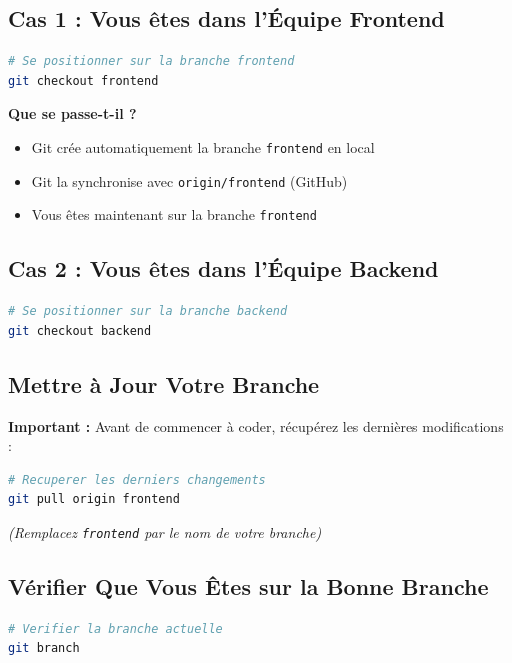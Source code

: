 \documentclass[11pt,a4paper]{article}
\begin{document}
\subsection{Cas 1 : Vous êtes dans l'Équipe Frontend}

\begin{lstlisting}[language=bash]
# Se positionner sur la branche frontend
git checkout frontend
\end{lstlisting}

\textbf{Que se passe-t-il ?}
\begin{itemize}
    \item[\faIcon{check}] Git crée automatiquement la branche \texttt{frontend} en local
    \item[\faIcon{check}] Git la synchronise avec \texttt{origin/frontend} (GitHub)
    \item[\faIcon{check}] Vous êtes maintenant sur la branche \texttt{frontend}
\end{itemize}

\subsection{Cas 2 : Vous êtes dans l'Équipe Backend}

\begin{lstlisting}[language=bash]
# Se positionner sur la branche backend
git checkout backend
\end{lstlisting}

\subsection{Mettre à Jour Votre Branche}

\textbf{Important :} Avant de commencer à coder, récupérez les dernières modifications :

\begin{lstlisting}[language=bash]
# Recuperer les derniers changements
git pull origin frontend
\end{lstlisting}

\textit{(Remplacez \texttt{frontend} par le nom de votre branche)}

\subsection{Vérifier Que Vous Êtes sur la Bonne Branche}

\begin{lstlisting}[language=bash]
# Verifier la branche actuelle
git branch
\end{lstlisting}
\end{document}

